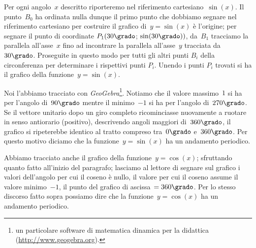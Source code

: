 Per ogni angolo~$x$ descritto riporteremo nel riferimento cartesiano~$\sin(x)$. Il punto~$B_0$ ha ordinata nulla dunque il primo punto che
dobbiamo segnare nel riferimento cartesiano per costruire il grafico di~$y=\sin(x)$ è l'origine; per segnare il punto di coordinate
$P_1(30\grado$; $\sin(30\grado))$, da~$B_1$ tracciamo la parallela all'asse~$x$ fino ad incontrare la parallela all'asse~$y$ tracciata da~$30\grado$.
Proseguite in questo modo per tutti gli altri punti $B_i$ della circonferenza per determinare i rispettivi punti $P_i$. Unendo i punti $P_i$ trovati si ha il grafico
della funzione~$y = \sin(x)$.

Noi l'abbiamo tracciato con \emph{GeoGebra}\footnote{un particolare software di matematica dinamica per la didattica (\url{http://www.geogebra.org}).}. Notiamo che il valore massimo~$1$ si ha per l'angolo di~$90\grado$ mentre il minimo~$-1$ si ha
per l'angolo di~$270\grado$. Se il vettore unitario dopo un giro completo ricominciasse nuovamente a ruotare in senso antiorario (positivo),
descrivendo angoli maggiori di~$360\grado$, il grafico si ripeterebbe identico al tratto compreso tra~$0\grado$ e~$360\grado$.
Per questo motivo diciamo che la funzione~$y= \sin(x)$ ha un andamento periodico.
\begin{center}
 
\end{center}


Abbiamo tracciato anche il grafico della funzione~$y=\cos(x)$; sfruttando quanto fatto all'inizio del paragrafo;
lasciamo al lettore di segnare sul grafico i valori dell'angolo per cui il coseno è nullo, il valore per cui il coseno
assume il valore minimo~$-1$, il punto del grafico di ascissa~$=360\grado$.
Per lo stesso discorso fatto sopra possiamo dire che la funzione~$y=\cos(x)$ ha un andamento periodico.
\begin{center}
 
\end{center}

\newpage

\cleardoublepage
